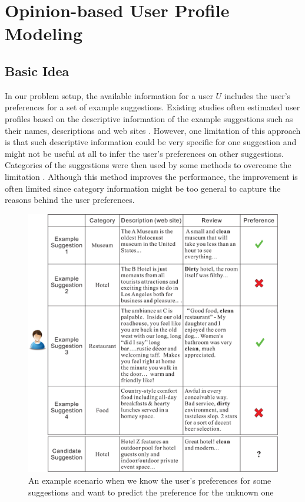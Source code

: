 \section{Opinion-based User Profile Modeling}  \label{sec:user} 

\subsection{Basic Idea} 

In our problem setup, the available information for a user $U$ includes 
the user's preferences for a set of example suggestions. 
Existing studies often estimated user profiles based on the descriptive 
information of the example suggestions such as their names, descriptions and 
web sites 
\cite{Yang:2013:OUP:2499178.2499191,udel:treccs2013,udel:treccs2012, 
irit:treccs2012, udben:treccs2012,uamst:treccs2013,cwi:treccs2013}. 
However, one limitation of this approach is that such descriptive information 
could be very specific for one suggestion and might not be useful at all to 
infer the user's preferences on other suggestions. Categories of the suggestions 
were then used by some methods to overcome the limitation  
\cite{georgetown:treccs2012,udel:treccs2012,isi:treccs2013}. 
Although this method improves the performance, the improvement is often 
limited since category information might be too general to capture the 
reasons behind the user preferences. 

\begin{figure}[t]
\centering
    \includegraphics[width=1.0\textwidth]{figures/irj_fig1.eps}
    \caption{An example scenario when we know the user's 
    preferences for some suggestions and want to 
    predict the preference for the unknown one}
    \label{chap5_fig0}
\end{figure}

